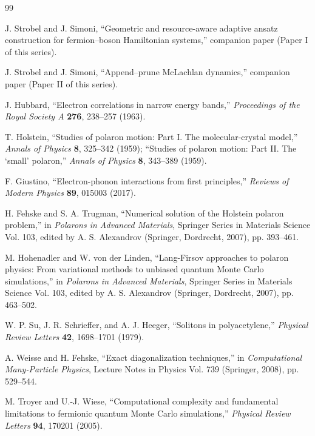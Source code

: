 \documentclass[
  reprint,
  amsmath,
  amssymb,
  aps,
  pra,
  nofootinbib,
  superscriptaddress,
  floatfix
]{revtex4-2}
\begin{document}
\begin{thebibliography}{99}

J. Strobel and J. Simoni,
``Geometric and resource-aware adaptive ansatz construction for fermion--boson Hamiltonian systems,''
companion paper (Paper I of this series).

J. Strobel and J. Simoni,
``Append--prune McLachlan dynamics,''
companion paper (Paper II of this series).

J. Hubbard,
``Electron correlations in narrow energy bands,''
\emph{Proceedings of the Royal Society A} \textbf{276}, 238--257 (1963).

T. Holstein,
``Studies of polaron motion: Part I. The molecular-crystal model,''
\emph{Annals of Physics} \textbf{8}, 325--342 (1959);
``Studies of polaron motion: Part II. The `small' polaron,''
\emph{Annals of Physics} \textbf{8}, 343--389 (1959).

F. Giustino,
``Electron-phonon interactions from first principles,''
\emph{Reviews of Modern Physics} \textbf{89}, 015003 (2017).

H. Fehske and S. A. Trugman,
``Numerical solution of the Holstein polaron problem,''
in \emph{Polarons in Advanced Materials}, Springer Series in Materials Science Vol. 103, edited by A. S. Alexandrov (Springer, Dordrecht, 2007), pp. 393--461.

M. Hohenadler and W. von der Linden,
``Lang-Firsov approaches to polaron physics: From variational methods to unbiased quantum Monte Carlo simulations,''
in \emph{Polarons in Advanced Materials}, Springer Series in Materials Science Vol. 103, edited by A. S. Alexandrov (Springer, Dordrecht, 2007), pp. 463--502.

W. P. Su, J. R. Schrieffer, and A. J. Heeger,
``Solitons in polyacetylene,''
\emph{Physical Review Letters} \textbf{42}, 1698--1701 (1979).

A. Weisse and H. Fehske,
``Exact diagonalization techniques,''
in \emph{Computational Many-Particle Physics}, Lecture Notes in Physics Vol. 739 (Springer, 2008), pp. 529--544.

M. Troyer and U.-J. Wiese,
``Computational complexity and fundamental limitations to fermionic quantum Monte Carlo simulations,''
\emph{Physical Review Letters} \textbf{94}, 170201 (2005).


\end{thebibliography}
\end{document}
